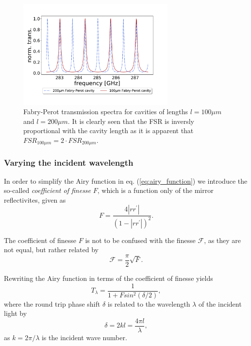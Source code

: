 \begin{figure}[h!]
    \centering
    \includegraphics[width=0.7\textwidth]{figures/100um_and_200um_fabry_perot_trans_vs_freq.pdf}
    \caption{Fabry-Perot transmission spectra for cavities of lengths $l = 100 \mu m$ and $l = 200 \mu m$. It is clearly seen that the FSR is inversly proportional with the cavity length as it is apparent that $FSR_{100 \mu m} = 2 \cdot FSR_{200 \mu m}$.}
    \label{fig:fabry_perot_FSR_comparison}
\end{figure}

\subsubsection{Varying the incident wavelength}

In order to simplify the Airy function in eq. (\ref{eq:airy_function}) we introduce the so-called \emph{coefficient of finesse} $F$, which is a function only of the mirror reflectivites, given as
\begin{equation}
    F = \frac{4 |rr^{\prime}|}{(1-|rr^{\prime}|)^2}.
\end{equation}

The coefficient of finesse $F$ is not to be confused with the finesse $\mathcal{F}$, as they are not equal, but rather related by
\begin{equation}
    \mathcal{F} = \frac{\pi}{2} \sqrt{F}.
\end{equation}

Rewriting the Airy function in terms of the coefficient of finesse yields
\begin{equation}
    T_{\lambda} = \frac{1}{1+ F sin^2 \left(\delta / 2\right)},
    \label{eq:simplified_airy_function}
\end{equation}
where the round trip phase shift $\delta$ is related to the wavelength $\lambda$ of the incident light by
\begin{equation}
    \delta = 2kl = \frac{4 \pi l }{\lambda},
\end{equation}
as $k = 2 \pi / \lambda$ is the incident wave number.

